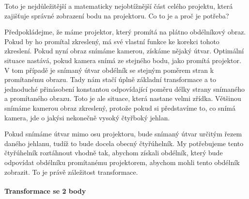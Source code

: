 \documentclass[twoside,12pt]{article}
\newcommand{\podpodsekce}[1]{\paragraph{#1}\quad\vskip 6pt}
\begin{document}
Toto je nejdůležitější a matematicky nejobtížnější část celého projektu, která zajišťuje správné zobrazení bodu na projektoru. Co to je a proč je potřeba?

Předpokládejme, že máme projektor, který promítá na plátno obdélníkový obraz. Pokud by ho promítal zkreslený, má své vlastní funkce ke korekci tohoto zkreslení. Pokud nyní obraz snímáme kamerou, získáme nějaký útvar. Optimální situace nastává, pokud kamera snímá ze stejného bodu, jako promítá projektor. V tom případě je snímaný útvar obdélník se stejným poměrem stran k promítanému obrazu. Tady nám stačí úplně základní transformace a to jednoduché přinásobení konstantou odpovídající poměru délky strany snímaného a promítaného obrazu. Toto je ale situace, která nastane velmi zřídka. Většinou snímáme kamerou obraz zkreslený, protože pokud si představíme to, co snímá kamera, jde o jakýsi nekonečně vysoký čtyřboký jehlan.

Pokud snímáme útvar mimo osu projektoru, bude snímaný útvar určitým řezem daného jehlanu, tudíž to bude docela obecný čtyřúhelník. My potřebujeme tento čtyřúhelník roztáhnout vhodně tak, abychom získali obdélník, který bude odpovídat obdélníku promítanému projektorem, abychom mohli tento obdélník zobrazit. To je právě záležitost transformace.

\podpodsekce{Transformace se 2 body}
\end{document}
